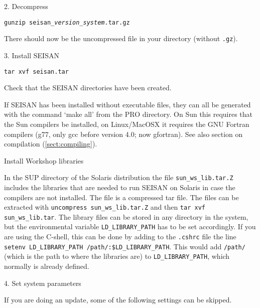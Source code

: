 2.  Decompress 

\texttt{gunzip seisan\_\textit{version}\_\textit{system}.tar.gz}

There should now be the uncompressed file in your directory (without \texttt{.gz}). 

3. Install SEISAN 

\texttt{tar xvf seisan.tar}

Check that the SEISAN directories have been created. 

If SEISAN has been installed without executable files, they can all be generated with the command `make all' from the PRO directory. On Sun this requires that the Sun compilers be installed, on Linux/MacOSX it requires the GNU Fortran compilers (g77, only gcc before version 4.0; now gfortran). See also section on compilation (\ref{sect:compiling}). 

Install Workshop libraries 

In the SUP directory of the Solaris distribution the file 
\texttt{sun\_ws\_lib.tar.Z} 
includes the libraries that are needed to run SEISAN on Solaris in 
case the compilers are not installed. The file is a compressed tar file. 
The files can be extracted with \texttt{uncompress sun\_ws\_lib.tar.Z} 
and then \texttt{tar xvf sun\_ws\_lib.tar}. The library files can be 
stored in any directory in the system, but the environmental 
variable \texttt{LD\_LIBRARY\_PATH}
 has to be set accordingly. 
If you are using the C-shell, this can be done by adding to 
the \texttt{.cshrc} file the line 
\texttt{setenv LD\_LIBRARY\_PATH /path/:\$LD\_LIBRARY\_PATH}. 
This would add \texttt{/path/} (which is the path to where the libraries are) 
to \texttt{LD\_LIBRARY\_PATH}, which normally is already defined. 

4. Set system parameters 

If you are doing an update, some of the following settings can be skipped. 


